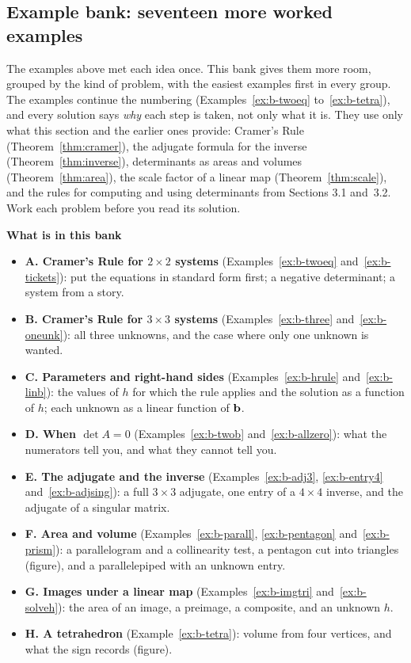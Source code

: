 \documentclass[11pt]{article}
\begin{document}
\subsection*{Example bank: seventeen more worked examples}

The examples above met each idea once. This bank gives them more room, grouped by the kind of problem, with the easiest examples first in every group. The examples continue the numbering (Examples~\ref{ex:b-twoeq} to~\ref{ex:b-tetra}), and every solution says \emph{why} each step is taken, not only what it is. They use only what this section and the earlier ones provide: Cramer's Rule (Theorem~\ref{thm:cramer}), the adjugate formula for the inverse (Theorem~\ref{thm:inverse}), determinants as areas and volumes (Theorem~\ref{thm:area}), the scale factor of a linear map (Theorem~\ref{thm:scale}), and the rules for computing and using determinants from Sections 3.1 and~3.2. Work each problem before you read its solution.

\textbf{What is in this bank}
\begin{itemize}
  \item \textbf{A. Cramer's Rule for $2\times2$ systems} (Examples~\ref{ex:b-twoeq} and~\ref{ex:b-tickets}): put the equations in standard form first; a negative determinant; a system from a story.
  \item \textbf{B. Cramer's Rule for $3\times3$ systems} (Examples~\ref{ex:b-three} and~\ref{ex:b-oneunk}): all three unknowns, and the case where only one unknown is wanted.
  \item \textbf{C. Parameters and right-hand sides} (Examples~\ref{ex:b-hrule} and~\ref{ex:b-linb}): the values of $h$ for which the rule applies and the solution as a function of $h$; each unknown as a linear function of $\mathbf{b}$.
  \item \textbf{D. When $\det A=0$} (Examples~\ref{ex:b-twob} and~\ref{ex:b-allzero}): what the numerators tell you, and what they cannot tell you.
  \item \textbf{E. The adjugate and the inverse} (Examples~\ref{ex:b-adj3}, \ref{ex:b-entry4} and~\ref{ex:b-adjsing}): a full $3\times3$ adjugate, one entry of a $4\times4$ inverse, and the adjugate of a singular matrix.
  \item \textbf{F. Area and volume} (Examples~\ref{ex:b-parall}, \ref{ex:b-pentagon} and~\ref{ex:b-prism}): a parallelogram and a collinearity test, a pentagon cut into triangles (figure), and a parallelepiped with an unknown entry.
  \item \textbf{G. Images under a linear map} (Examples~\ref{ex:b-imgtri} and~\ref{ex:b-solveh}): the area of an image, a preimage, a composite, and an unknown $h$.
  \item \textbf{H. A tetrahedron} (Example~\ref{ex:b-tetra}): volume from four vertices, and what the sign records (figure).
\end{itemize}
\end{document}
